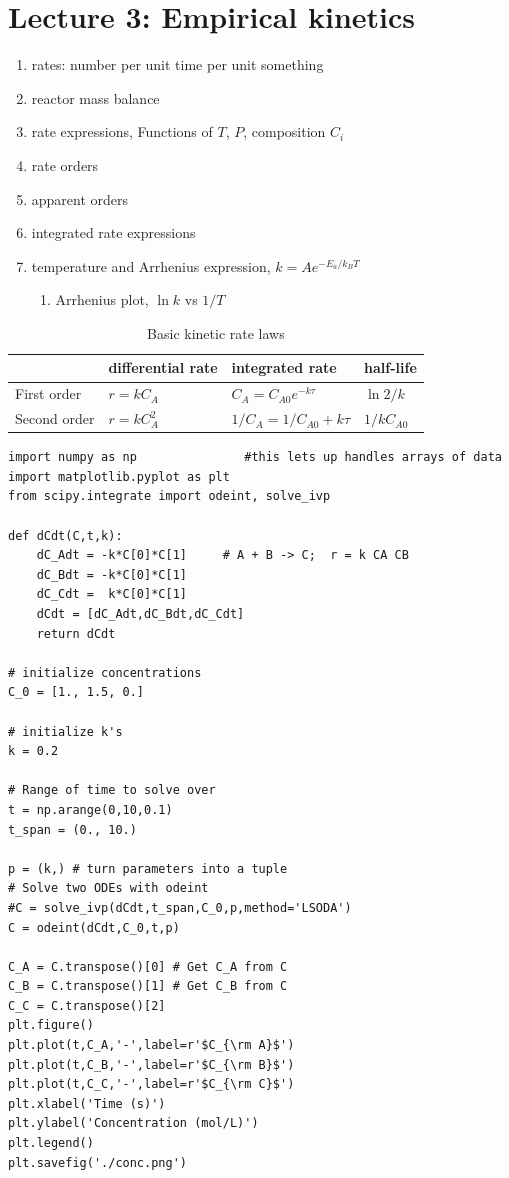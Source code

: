 \documentclass[11pt]{article}
\begin{document}
\section{Lecture 3: Empirical kinetics}
\label{sec:orgcae0964}
\begin{enumerate}
\item rates: number per unit time per unit something
\item reactor mass balance
\item rate expressions, Functions of \(T\), \(P\), composition \(C_i\)
\item rate orders
\item apparent orders
\item integrated rate expressions
\item temperature and Arrhenius expression, \(k=A e^{-E_a/k_BT}\)
\begin{enumerate}
\item Arrhenius plot, \(\ln k\) vs \(1/T\)
\end{enumerate}
\end{enumerate}

\begin{table}[htbp]
\caption{Basic kinetic rate laws}
\centering
\begin{tabular}{llll}
\hline
 & differential rate & integrated rate & half-life\\
\hline
First order & \(r = kC_A\) & \(C_A = C_{A0} e^{-k \tau}\) & \(\ln 2/k\)\\
Second order & \(r = kC_A^2\) & \(1/C_A = 1/C_{A0} + k \tau\) & \(1/kC_{A0}\)\\
\end{tabular}
\end{table}


\begin{verbatim}
import numpy as np               #this lets up handles arrays of data
import matplotlib.pyplot as plt
from scipy.integrate import odeint, solve_ivp

def dCdt(C,t,k):
    dC_Adt = -k*C[0]*C[1]     # A + B -> C;  r = k CA CB
    dC_Bdt = -k*C[0]*C[1]
    dC_Cdt =  k*C[0]*C[1]
    dCdt = [dC_Adt,dC_Bdt,dC_Cdt] 
    return dCdt

# initialize concentrations
C_0 = [1., 1.5, 0.]

# initialize k's
k = 0.2

# Range of time to solve over
t = np.arange(0,10,0.1) 
t_span = (0., 10.)

p = (k,) # turn parameters into a tuple
# Solve two ODEs with odeint
#C = solve_ivp(dCdt,t_span,C_0,p,method='LSODA')
C = odeint(dCdt,C_0,t,p)

C_A = C.transpose()[0] # Get C_A from C
C_B = C.transpose()[1] # Get C_B from C
C_C = C.transpose()[2]
plt.figure()
plt.plot(t,C_A,'-',label=r'$C_{\rm A}$')
plt.plot(t,C_B,'-',label=r'$C_{\rm B}$')
plt.plot(t,C_C,'-',label=r'$C_{\rm C}$')
plt.xlabel('Time (s)')
plt.ylabel('Concentration (mol/L)')
plt.legend()
plt.savefig('./conc.png')
\end{verbatim}
\end{document}
